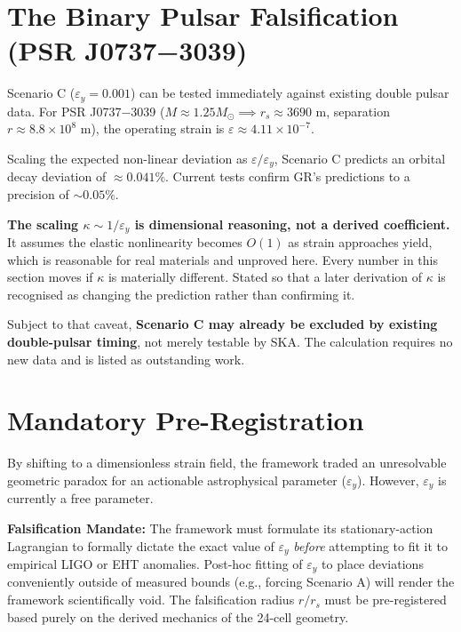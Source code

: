 \documentclass[11pt, letterpaper, openany]{book}
\begin{document}
\section{The Binary Pulsar Falsification (PSR J0737−3039)}

Scenario C ($\varepsilon_y = 0.001$) can be tested immediately against existing double pulsar data. For PSR J0737−3039 ($M \approx 1.25 M_\odot \implies r_s \approx 3690$ m, separation $r \approx 8.8 \times 10^8$ m), the operating strain is $\varepsilon \approx 4.11 \times 10^{-7}$. 

Scaling the expected non-linear deviation as $\varepsilon / \varepsilon_y$, Scenario C predicts an orbital decay deviation of $\approx 0.041\%$. Current tests confirm GR's predictions to a precision of $\sim 0.05\%$.

\begin{warningbox}
\textbf{The scaling $\kappa \sim 1/\varepsilon_y$ is dimensional reasoning, not a derived
coefficient.} It assumes the elastic nonlinearity becomes $O(1)$ as strain approaches yield, which
is reasonable for real materials and unproved here. Every number in this section moves if $\kappa$
is materially different. Stated so that a later derivation of $\kappa$ is recognised as changing the
prediction rather than confirming it.

\medskip
Subject to that caveat, \textbf{Scenario C may already be excluded by existing double-pulsar
timing}, not merely testable by SKA. The calculation requires no new data and is listed as
outstanding work.
\end{warningbox}

\section{Mandatory Pre-Registration}

By shifting to a dimensionless strain field, the framework traded an unresolvable geometric paradox for an actionable astrophysical parameter ($\varepsilon_y$). However, $\varepsilon_y$ is currently a free parameter.

\textbf{Falsification Mandate:} The framework must formulate its stationary-action Lagrangian to formally dictate the exact value of $\varepsilon_y$ \textit{before} attempting to fit it to empirical LIGO or EHT anomalies. Post-hoc fitting of $\varepsilon_y$ to place deviations conveniently outside of measured bounds (e.g., forcing Scenario A) will render the framework scientifically void. The falsification radius $r/r_s$ must be pre-registered based purely on the derived mechanics of the 24-cell geometry.
\end{document}
